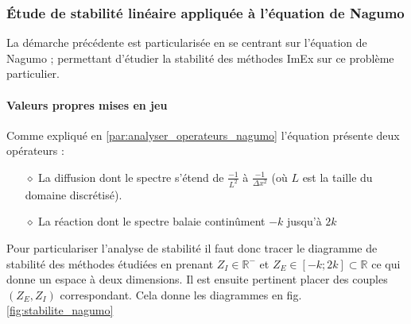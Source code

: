 \subsubsection{Étude de stabilité linéaire appliquée à l'équation de Nagumo}
    La démarche précédente est particularisée en se centrant sur l'équation de Nagumo ; 
    permettant d'étudier la stabilité des méthodes ImEx sur ce problème particulier.
    \paragraph{Valeurs propres mises en jeu}
        Comme expliqué en \ref{par:analyser_operateurs_nagumo} l'équation présente deux opérateurs : 
        \begin{itemize}
            \item[$\diamond$] La diffusion dont le spectre s'étend de $\frac{-1}{L^2}$ à $\frac{-1}{\Delta x^2}$ (où $L$ est la taille du domaine discrétisé).
            \item[$\diamond$] La réaction dont le spectre balaie continûment $-k$ jusqu'à $2k$
        \end{itemize}
        Pour particulariser l'analyse de stabilité il faut donc tracer le diagramme de stabilité des méthodes étudiées en prenant $Z_I \in \mathbb{R}^-$ 
        et $Z_E \in [-k;2k] \subset \mathbb{R}$ ce qui donne un espace à deux dimensions. Il est ensuite pertinent placer des couples $(Z_E,Z_I)$ correspondant.
        Cela donne les diagrammes en fig. \ref{fig:stabilite_nagumo}
